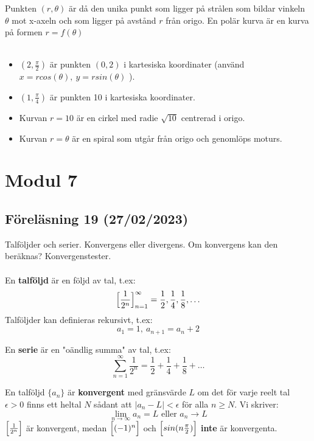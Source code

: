 \documentclass{report}
\begin{document}
\noindent
Punkten $ (r, \theta) $ är då den unika punkt som ligger på strålen som bildar vinkeln $ \theta $ mot x-axeln och som ligger på avstånd $ r $ från origo. En polär kurva är en kurva på formen $ r = f(\theta) $\\\\

\noindent
\begin{itemize}
	\item $ (2, \frac{\pi}{2} ) $ är punkten $ (0,2) $ i kartesiska koordinater (använd $ x = rcos(\theta),\: y = rsin(\theta) $ ).
	\item $ (1, \frac{\pi}{4} ) $ är punkten 10 i kartesiska koordinater.
	\item Kurvan $ r = 10 $ är en cirkel med radie $ \sqrt{10}  $ centrerad i origo.
	\item Kurvan $ r = \theta $ är en spiral som utgår från origo och genomlöps moturs.
\end{itemize}

\pagebreak
\chapter{Modul 7}
\section{Föreläsning 19 (27/02/2023)}
Talföljder och serier. Konvergens eller divergens. Om konvergens kan den beräknas? Konvergenstester.\\\\

\noindent
En \textbf{talföljd} är en följd av tal, t.ex:
\begin{equation*}
	\Bigl[ \frac{1}{2^n} \Bigr]_{n=1}^{ \infty} = \frac{1}{2} , \frac{1}{4} , \frac{1}{8} , \ldots 
\end{equation*}
Talföljder kan definieras rekursivt, t.ex:
\begin{equation*}
	a_1 = 1,\: a_{n+1} = a_n + 2
\end{equation*}


\noindent
En \textbf{serie } är en "oändlig summa" av tal, t.ex:
\begin{equation*}
\sum_{n=1}^{ \infty} \frac{1}{2^n} = \frac{1}{2} + \frac{1}{4} + \frac{1}{8} + \ldots 
\end{equation*}

{
En talföljd $ \{ a_n \} $ är \textbf{konvergent} med gränsvärde $ L $ om det för varje reelt tal $ \epsilon > 0 $ finns ett heltal $ N $  sådant att $ |a_n - L| < \epsilon $ för alla $ n \ge N $. Vi skriver:
\begin{equation*}
\lim_{n \to \infty} a_n = L \text{ eller } a_n \to L
\end{equation*}
}
\ex{}
{
	$ \Bigl[ \frac{1}{2^n} \Bigr] $ är konvergent, medan $ \Bigl[ (-1)^n \Bigr] $ och $ \Bigl[ sin(n \frac{\pi}{2} )  \Bigl] $ \textbf{inte} är konvergenta.
}
\end{document}
